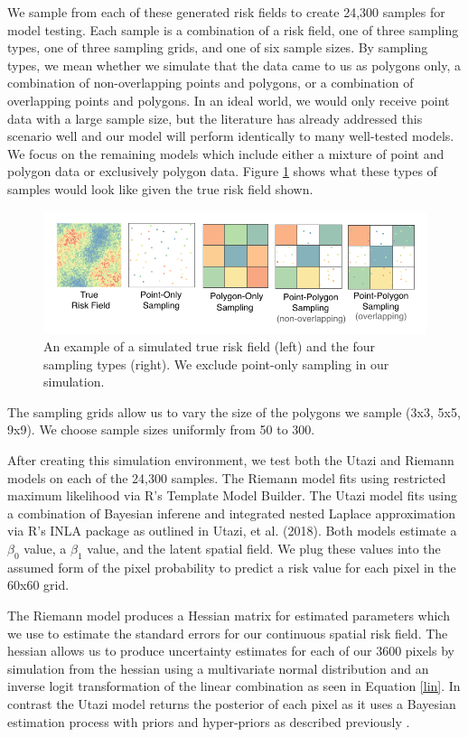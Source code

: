 \documentclass{article}
\begin{document}
We sample from each of these generated risk fields to create 24,300 samples for model testing. Each sample is a combination of a risk field, one of three sampling types, one of three sampling grids, and one of six sample sizes. By sampling types, we mean whether we simulate that the data came to us as polygons only, a combination of non-overlapping points and polygons, or a combination of overlapping points and polygons. In an ideal world, we would only receive point data with a large sample size, but the literature has already addressed this scenario well and our model will perform identically to many well-tested models. We focus on the remaining models which include either a mixture of point and polygon data or exclusively polygon data. Figure \ref{fig:samplingPlot} shows what these types of samples would look like given the true risk field shown.

\begin{figure}[ht]
    \centering
    \includegraphics[width=.7\textwidth]{./figures/samplingtypes2.png}
    \caption{An example of a simulated true risk field (left) and the four sampling types (right). We exclude point-only sampling in our simulation.}
    \label{fig:samplingPlot}
\end{figure}

The sampling grids allow us to vary the size of the polygons we sample (3x3, 5x5, 9x9). We choose sample sizes uniformly from 50 to 300.

After creating this simulation environment, we test both the Utazi and Riemann models on each of the 24,300 samples. The Riemann model fits using restricted maximum likelihood via R's Template Model Builder. The Utazi model fits using a combination of Bayesian inferene and integrated nested Laplace approximation via R's INLA package as outlined in Utazi, et al. (2018). Both models estimate a $\beta_0$ value, a  $\beta_1$ value, and the latent spatial field. We plug these values into the assumed form of the pixel probability to predict a risk value for each pixel in the 60x60 grid. 

The Riemann model produces a Hessian matrix for estimated parameters which we use to estimate the standard errors for our continuous spatial risk field. The hessian allows us to produce uncertainty estimates for each of our 3600 pixels by simulation from the hessian using a multivariate normal distribution and an inverse logit transformation of the linear combination as seen in Equation \ref{lin}. In contrast the Utazi model returns the posterior of each pixel as it uses a Bayesian estimation process with priors and hyper-priors as described previously \cite{Utazi2018a}.
\end{document}
